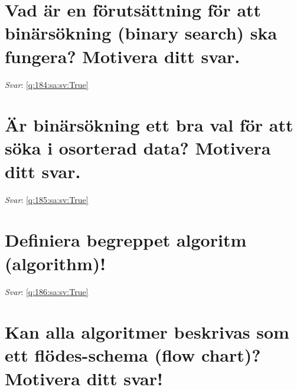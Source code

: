 \documentclass[a4paper,11pt,oneside]{book}
\begin{document}
\begin{sloppypar}
\section{Vad \"ar en f\"oruts\"attning f\"or att bin\"ars\"okning (binary search) ska fungera? Motivera ditt svar.}

\label{q:184:sa:sv:False}

\vspace{2cm}

\noindent\makebox[\textwidth]{\hrulefill}

\vspace{1cm}

\textit{Svar}: \autoref{q:184:sa:sv:True}



\section{\"Ar bin\"ars\"okning ett bra val f\"or att s\"oka i osorterad data? Motivera ditt svar.}

\label{q:185:sa:sv:False}

\vspace{2cm}

\noindent\makebox[\textwidth]{\hrulefill}

\vspace{1cm}

\textit{Svar}: \autoref{q:185:sa:sv:True}



\section{Definiera begreppet algoritm (algorithm)!}

\label{q:186:sa:sv:False}

\vspace{2cm}

\noindent\makebox[\textwidth]{\hrulefill}

\vspace{1cm}

\textit{Svar}: \autoref{q:186:sa:sv:True}



\section{Kan alla algoritmer beskrivas som ett fl\"odes-schema (flow chart)? Motivera ditt svar!}

\label{q:187:sa:sv:False}


\end{sloppypar}
\end{document}
